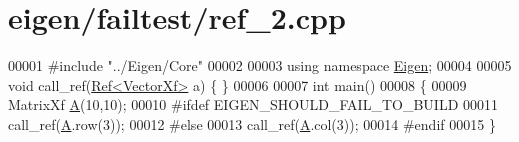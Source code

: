 \hypertarget{eigen_2failtest_2ref__2_8cpp_source}{}\section{eigen/failtest/ref\+\_\+2.cpp}
\label{eigen_2failtest_2ref__2_8cpp_source}

\begin{DoxyCode}
00001 \textcolor{preprocessor}{#include "../Eigen/Core"}
00002 
00003 \textcolor{keyword}{using namespace }\hyperlink{namespace_eigen}{Eigen};
00004 
00005 \textcolor{keywordtype}{void} call\_ref(\hyperlink{group___core___module_class_eigen_1_1_ref}{Ref<VectorXf>} a) \{ \}
00006 
00007 \textcolor{keywordtype}{int} main()
00008 \{
00009   MatrixXf \hyperlink{group___core___module_class_eigen_1_1_matrix}{A}(10,10);
00010 \textcolor{preprocessor}{#ifdef EIGEN\_SHOULD\_FAIL\_TO\_BUILD}
00011   call\_ref(\hyperlink{group___core___module_class_eigen_1_1_matrix}{A}.row(3));
00012 \textcolor{preprocessor}{#else}
00013   call\_ref(\hyperlink{group___core___module_class_eigen_1_1_matrix}{A}.col(3));
00014 \textcolor{preprocessor}{#endif}
00015 \}
\end{DoxyCode}

